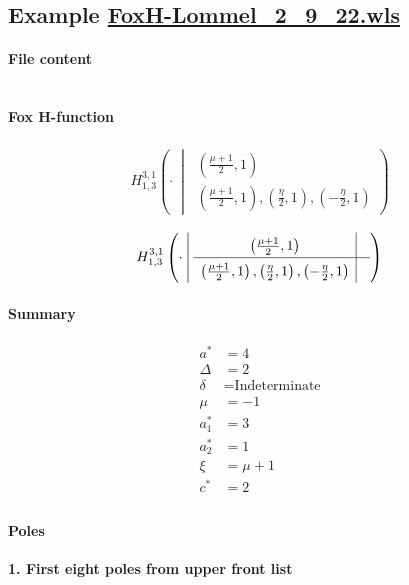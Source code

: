 \documentclass[preview]{standalone}
\newcommand{\FoxH}[5]{H_{#2}^{#1}\left(#3\:\middle\vert\: \begin{array}{l}#4\\[0.4em] #5\end{array}\right)}
\begin{document}
\subsection{Example \url{FoxH-Lommel_2_9_22.wls}}

\paragraph{File content}

\inputminted{text}{../Examples/FoxH-Lommel_2_9_22.wls}

\paragraph{Fox H-function}

\begin{align*}
  \FoxH
    {3,1}
    {1,3}
    {\cdot}
    {\left(\frac{\mu +1}{2}, 1\right)}
    {\left(\frac{\mu +1}{2}, 1\right), \left(\frac{\eta }{2}, 1\right), \left(-\frac{\eta }{2}, 1\right)}
\end{align*}

\begin{align*}
  \FoxHext
    {3,1}
    {1,3}
    {\cdot}
    {\left(\frac{\mu +1}{2}, 1\right)}
    {}
    {\left(\frac{\mu +1}{2}, 1\right), \left(\frac{\eta }{2}, 1\right), \left(-\frac{\eta }{2}, 1\right)}
    {}
\end{align*}

\paragraph{Summary}

\begin{align*}
  a^*    & = 4 \\
  \Delta & = 2 \\
  \delta & = \text{Indeterminate} \\
  \mu    & = -1 \\
  a_1^*  & = 3 \\
  a_2^*  & = 1 \\
  \xi    & = \mu +1 \\
  c^*    & = 2 \\
\end{align*}

\paragraph{Poles}

\noindent\textbf{1. First eight poles from upper front list}
\end{document}
